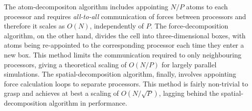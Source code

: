 The atom-decompositon algorithm includes appointing $N/P$ atoms to each processor and requires \textit{all-to-all} communication of forces between processors and therefore it scales as $O(N)$, independently of $P$. 
The force-decomposition algorithm, on the other hand, divides the cell into three-dimensional boxes, with atoms being re-appointed to the corresponding processor each time they enter a new box. 
This method limits the communication required to only neighbouring processors, giving a theoretical scaling of $O(N/P)$ for largely parallel simulations.
The spatial-decomposition algorithm, finally, involves appointing force calculation loops to separate processors.
This method is fairly non-trivial to grasp and achieves at best a scaling of $O(N/\sqrt{P})$, lagging behind the spatial-decomposition algorithm in performance. \cite{fincham1987parallel,lammpsMD}


